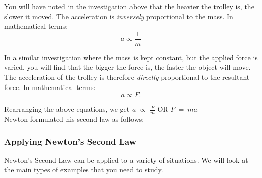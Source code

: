 You will have noted in the investigation above that the heavier the trolley is, the slower it moved. The acceleration is \textit{inversely} proportional to the mass. In mathematical terms:
\begin{equation*}
a \propto \frac{1}{m}
\end{equation*}

In a similar investigation where the mass is kept constant, but the applied force is varied, you will find that the bigger the force is, the faster the object will move. The acceleration of the trolley is therefore \textit{directly} proportional to the resultant force. In mathematical terms:
\begin{equation*}
a \propto F.
\end{equation*}

Rearranging the above equations, we get $a$ $\propto$ $\frac{F}{m}$ OR $F~=~ma$\\

Newton formulated his second law as follows:\\

\subsubsection{Applying Newton's Second Law}
Newton's Second Law can be applied to a variety of situations. We will look at the main types of examples that you need to study.


